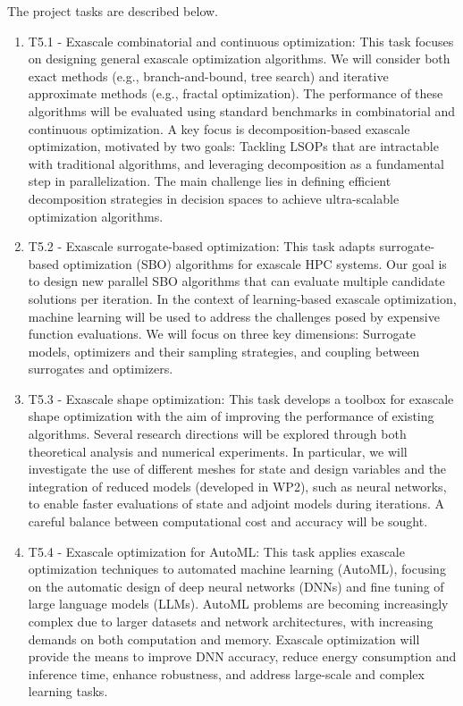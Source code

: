 The project tasks are described below.
\begin{enumerate}
\item T5.1 - Exascale combinatorial and continuous optimization: This task focuses on designing general exascale optimization algorithms. We will consider both exact methods (e.g., branch-and-bound, tree search)
and iterative approximate methods (e.g., fractal optimization). The performance of these algorithms will be evaluated using standard benchmarks in combinatorial and continuous optimization. A key focus is decomposition-based exascale optimization, motivated by two goals: Tackling LSOPs that are intractable with traditional algorithms, and leveraging decomposition as a fundamental step in parallelization. The main challenge lies in defining efficient decomposition strategies in decision spaces to achieve ultra-scalable optimization algorithms.

\item T5.2 - Exascale surrogate-based optimization: This task adapts surrogate-based optimization (SBO) algorithms for exascale HPC systems. Our goal is to design new parallel SBO algorithms that can evaluate
multiple candidate solutions per iteration. In the context of learning-based exascale optimization, machine learning will be used to address the challenges posed by expensive function evaluations. We will focus on three key dimensions: Surrogate models, optimizers and their sampling strategies, and coupling between surrogates and optimizers.

\item T5.3 - Exascale shape optimization: This task develops a toolbox for exascale shape optimization with the aim of improving the performance of existing algorithms. Several research directions will be explored through both theoretical analysis and numerical experiments. In particular, we will investigate the use of different meshes for state and design variables and the integration of reduced models (developed in WP2), such as neural networks, to enable faster evaluations of state and adjoint models during iterations. A careful balance between
computational cost and accuracy will be sought.

\item T5.4 - Exascale optimization for AutoML: This task applies exascale optimization techniques to automated machine learning (AutoML), focusing on the automatic design of deep neural networks (DNNs) and fine tuning of large language models (LLMs). AutoML problems are becoming increasingly complex due to larger datasets and
network architectures, with increasing demands on both computation and memory. Exascale optimization will provide the means to improve DNN accuracy, reduce energy consumption and inference time, enhance robustness, and address large-scale and complex learning tasks.
\end{enumerate}

